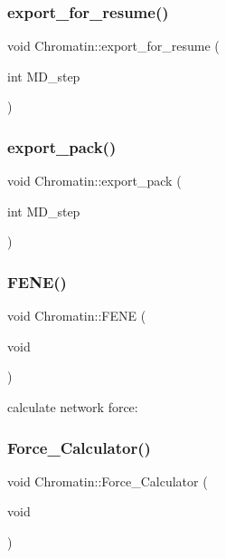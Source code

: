 \mbox{\label{classChromatin_ab220d2c995636e6c2a50e5bacf6a7105}} 
\subsubsection{\texorpdfstring{export\_for\_resume()}{export\_for\_resume()}}
{\footnotesize\ttfamily void Chromatin\+::export\+\_\+for\+\_\+resume (\begin{DoxyParamCaption}\item[{int}]{M\+D\+\_\+step }\end{DoxyParamCaption})}

\mbox{\label{classChromatin_a73cbccc73e3676425082c8c233919ee0}} 
\subsubsection{\texorpdfstring{export\_pack()}{export\_pack()}}
{\footnotesize\ttfamily void Chromatin\+::export\+\_\+pack (\begin{DoxyParamCaption}\item[{int}]{M\+D\+\_\+step }\end{DoxyParamCaption})}

\mbox{\label{classChromatin_a22b0a397c521e9775a0fedc027aaf709}} 
\subsubsection{\texorpdfstring{FENE()}{FENE()}}
{\footnotesize\ttfamily void Chromatin\+::\+F\+E\+NE (\begin{DoxyParamCaption}\item[{void}]{ }\end{DoxyParamCaption})}

calculate network force\+: \mbox{\label{classChromatin_a37cf6dcb2eca02312739e4b14e48c2b9}} 
\subsubsection{\texorpdfstring{Force\_Calculator()}{Force\_Calculator()}}
{\footnotesize\ttfamily void Chromatin\+::\+Force\+\_\+\+Calculator (\begin{DoxyParamCaption}\item[{void}]{ }\end{DoxyParamCaption})}


